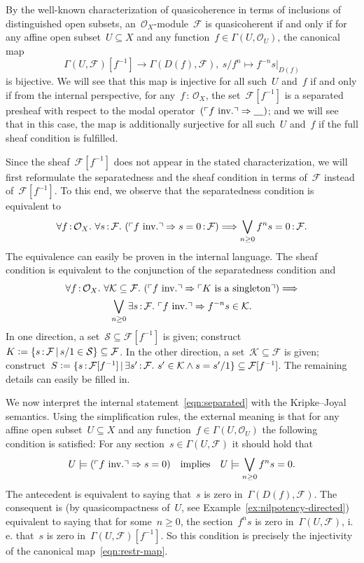 \documentclass[10pt,reqno,a4paper]{amsbook}
\makeatletter
\theoremstyle{definition}
\theoremstyle{plain}
\theoremstyle{remark}
\newcommand{\F}{\mathcal{F}}
\renewcommand{\O}{\mathcal{O}}
\newcommand{\K}{\mathcal{K}}
\renewcommand{\S}{\mathcal{S}}
\newcommand{\placeholder}{\underline{\quad}}
\newcommand{\?}{\,{:}\,}
\renewcommand{\_}{\mathpunct{.}\,}
\newcommand{\speak}[1]{\ulcorner\text{\textnormal{#1}}\urcorner}
\newcommand{\lra}{\longrightarrow}
\newcommand{\ie}{i.\,e.\@\xspace}
\newcommand{\inv}{inv.\@}
\newcommand{\defeq}{\vcentcolon=}
\renewenvironment{proof}[1][\proofname]{\par
  \pushQED{\qed}%
  \normalfont \topsep6\p@\@plus6\p@\relax
  \trivlist
  \item[\hskip\labelsep
        \itshape
    #1\@addpunct{.}]\ignorespaces
}{%
  \popQED\endtrivlist\@endpefalse
}
\makeatother
\begin{document}
\begin{proof}[Proof of Theorem~\ref{thm:qcoh-sheafchar}]
By the well-known characterization of quasicoherence in terms of inclusions of
distinguished open subsets, an~$\O_X$-module~$\F$ is quasicoherent if and only
if for any affine open subset~$U \subseteq X$ and any function~$f \in
\Gamma(U,\O_U)$, the canonical map
\begin{equation}\label{eqn:restr-map}
  \Gamma(U,\F)[f^{-1}] \lra \Gamma(D(f),\F), \ s/f^n \longmapsto
  f^{-n} s|_{D(f)}
\end{equation}
is bijective. We will see that this map is injective for all such~$U$ and~$f$
if and only if from the internal perspective, for any~$f\?\O_X$, the set~$\F[f^{-1}]$ is a
separated presheaf with respect to the modal operator~$(\speak{$f$ \inv}
\Rightarrow \placeholder)$; and we will see that in this
case, the map is additionally surjective for all such~$U$ and~$f$ if the full
sheaf condition is fulfilled.

Since the sheaf~$\F[f^{-1}]$ does not appear in the stated characterization, we
will first reformulate the separatedness and the sheaf condition in terms
of~$\F$ instead of~$\F[f^{-1}]$. To this end, we observe that the separatedness
condition is equivalent to
\begin{equation}\label{eqn:separated}
  \forall f\?\O_X\_ \forall s\?\F\_
  (\speak{$f$ \inv} \Rightarrow s = 0 \? \F) \Longrightarrow
  \bigvee_{n \geq 0} f^n s = 0 \? \F.
\end{equation}
The equivalence can easily be proven in the internal language. The sheaf
condition is equivalent to the conjunction of the separatedness condition and
\begin{multline}\label{eqn:sheaf}
  \forall f\?\O_X\_ \forall \K \subseteq \F\_
  (\speak{$f$ \inv} \Rightarrow \speak{$K$ is a singleton})
  \Longrightarrow \\
  \bigvee_{n \geq 0} \exists s\?\F\_
  \speak{$f$ \inv} \Rightarrow f^{-n} s \in \K.
\end{multline}
In one direction, a set~$\S \subseteq \F[f^{-1}]$ is given; construct~$K \defeq \{
s\?\F \,|\, s/1 \in \S \} \subseteq \F$. In the other direction, a set~$\K
\subseteq \F$ is given; construct~$S \defeq \{ s\?\F[f^{-1}] \,|\, \exists
s'\?\F\_ s' \in \K \wedge s = s'/1 \} \subseteq \F[f^{-1}]$. The remaining
details can easily be filled in.

We now interpret the internal statement~\eqref{eqn:separated} with the
Kripke--Joyal semantics. Using the simplification rules, the external meaning
is that for any affine open subset~$U \subseteq X$ and any function~$f \in
\Gamma(U,\O_U)$ the following condition is satisfied: For any section~$s \in
\Gamma(U,\F)$ it should hold that
\[ U \models (\speak{$f$ \inv} \Rightarrow s = 0) \quad\text{implies}\quad
  U \models \bigvee_{n \geq 0} f^n s = 0. \]
The antecedent is equivalent to saying that~$s$ is zero in~$\Gamma(D(f),\F)$.
The consequent is (by quasicompactness of~$U$, see
Example~\ref{ex:nilpotency-directed}) equivalent to saying that for some~$n \geq 0$, the
section~$f^n s$ is zero in~$\Gamma(U,\F)$, \ie that~$s$ is zero
in~$\Gamma(U,\F)[f^{-1}]$. So this condition is precisely the injectivity of
the canonical map~\eqref{eqn:restr-map}.


\end{proof}
\end{document}
